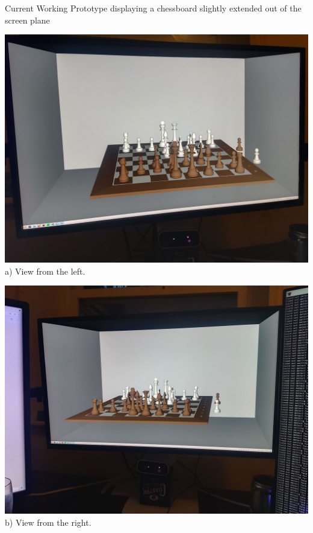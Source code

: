 \begin{figureBox}[label={fig:prototype}]{Current Working Prototype displaying a chessboard slightly extended out of the screen plane}
    \begin{minipage}[t]{0.48\textwidth}
        \includegraphics[width=\textwidth]{./project plan/figures/view_left.jpg}
        \small {a) View from the left.}
    \end{minipage}\hfill
    \begin{minipage}[t]{0.48\textwidth}
        \includegraphics[width=\textwidth]{./project plan/figures/view_right.jpg}
        \small {b) View from the right.}
    \end{minipage}
\end{figureBox}

